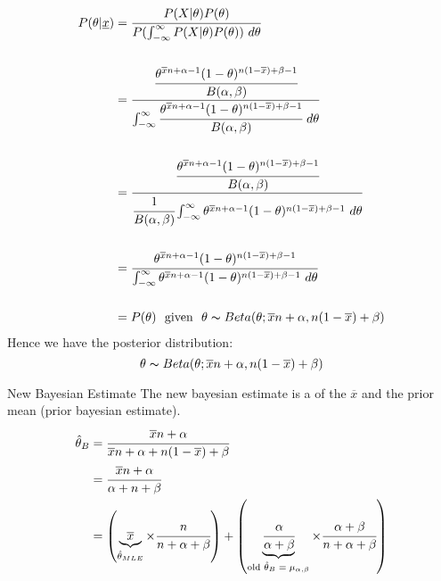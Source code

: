 \[\begin{split}
		P(\theta|\underline{x}) &= \cfrac{P(X|\theta)P(\theta)}{P(\int_{-\infty}^\infty P(X|\theta)P(\theta)) \ d\theta} \\
		\\
		&= \cfrac{\cfrac{\theta^{\overline{x}n + \alpha - 1}(1 - \theta)^{n(1 - \overline{x}) + \beta - 1}}{B(\alpha,\beta)}}{\int_{-\infty}^\infty \cfrac{\theta^{\overline{x}n + \alpha - 1}(1 - \theta)^{n(1 - \overline{x}) + \beta - 1}}{B(\alpha,\beta)} \ d\theta} \\
		\\
		&= \cfrac{\cfrac{\theta^{\overline{x}n + \alpha - 1}(1 - \theta)^{n(1 - \overline{x}) + \beta - 1}}{B(\alpha,\beta)}}{\cfrac{1}{B(\alpha,\beta)}\int_{-\infty}^\infty \theta^{\overline{x}n + \alpha - 1}(1 - \theta)^{n(1 - \overline{x}) + \beta - 1} \ d\theta} \\
		\\
		&= \cfrac{\theta^{\overline{x}n + \alpha - 1}(1 - \theta)^{n(1 - \overline{x}) + \beta - 1}}{\int_{-\infty}^\infty \theta^{\overline{x}n + \alpha - 1}(1 - \theta)^{n(1 - \overline{x}) + \beta - 1} \ d\theta} \\
		\\
		&= P(\theta) \ \text{ given } \ \theta \thicksim Beta(\theta; \overline{x}n + \alpha, n(1 - \overline{x}) + \beta)
	\end{split}\]
Hence we have the posterior distribution:
\[\theta \thicksim Beta(\theta; \overline{x}n + \alpha, n(1 - \overline{x}) + \beta)\]
\begin{sidenotebox}{New Bayesian Estimate}
	The new bayesian estimate is a  of the  $\overline{x}$ and the prior mean (prior bayesian estimate).
	\[\begin{split}
			\hat{\theta}_B &= \cfrac{\overline{x}n + \alpha}{\overline{x}n + \alpha + n(1 - \overline{x}) + \beta} \\
			&= \cfrac{\overline{x}n + \alpha}{\alpha + n + \beta} \\
			&= \left( \underbrace{\overline{x}}_{\hat{\theta}_{MLE}} \times \cfrac{n}{n + \alpha + \beta} \right) + \left( \underbrace{\cfrac{\alpha}{\alpha+\beta}}_\text{old $\hat{\theta}_B = \mu_{\alpha,\beta}$} \times \cfrac{\alpha+\beta}{n + \alpha + \beta}\right)
		\end{split}\]
\end{sidenotebox}

